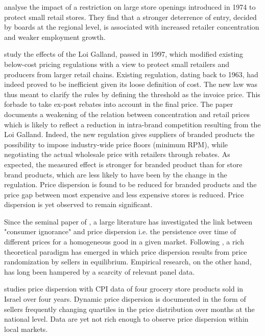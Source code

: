 \documentclass[english]{article}
\begin{document}

\cite{BER02} analyse the impact of a restriction on large store openings introduced in 1974 to protect small retail stores. They find that a stronger deterrence of entry, decided by boards at the regional level, is associated with increased retailer concentration and weaker employment growth.

\cite{BIS13} study the effects of the Loi Galland, passed in 1997, which modified existing below-cost pricing regulations with a view to protect small retailers and producers from larger retail chains. Existing regulation, dating back to 1963, had indeed proved to be inefficient given its loose definition of cost. The new law was thus meant to clarify the rules by defining the threshold as the invoice price. This forbade to take ex-post rebates into account in the final price. The paper documents a weakening of the relation between concentration and retail prices which is likely to reflect a reduction in intra-brand competition resulting from the Loi Galland. Indeed, the new regulation gives suppliers of branded products the possibility to impose industry-wide price floors (minimum RPM), while negotiating the actual wholesale price with retailers through rebates. As expected, the measured effect is stronger for branded product than for store brand products, which are less likely to have been by the change in the regulation. Price dispersion is found to be reduced for branded products and the price gap between most expensive and less expensive stores is reduced. Price dispersion is yet observed to remain significant.

Since the seminal paper of \cite{STI61}, a large literature has investigated the link between "consumer ignorance" and price dispersion i.e. the persistence over time of different prices for a homogeneous good in a given market. Following \cite{VAR80}, a rich theoretical paradigm has emerged in which price dispersion results from price randomization by sellers in equilibrium. Empirical research, on the other hand, has long been hampered by a scarcity of relevant panel data.

\cite{LAC02} studies price dispersion with CPI data of four grocery store products sold in Israel over four years. Dynamic price dispersion is documented in the form of sellers frequently changing quartiles in the price distribution over months at the national level. Data are yet not rich enough to observe price dispersion within local markets.
\end{document}
